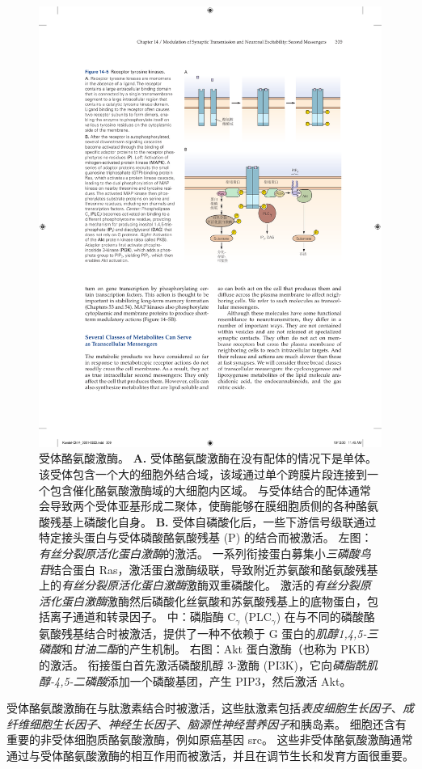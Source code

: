\begin{figure}[htbp]
	\centering
	\includegraphics[width=0.7\linewidth]{chap14/fig_14_5}
	\caption{受体酪氨酸激酶。 
		\textbf{A.} 受体酪氨酸激酶在没有配体的情况下是单体。
		该受体包含一个大的细胞外结合域，该域通过单个跨膜片段连接到一个包含催化酪氨酸激酶域的大细胞内区域。
		与受体结合的配体通常会导致两个受体亚基形成二聚体，使酶能够在膜细胞质侧的各种酪氨酸残基上磷酸化自身。
		\textbf{B.} 受体自磷酸化后，一些下游信号级联通过特定接头蛋白与受体磷酸酪氨酸残基 (P) 的结合而被激活。
		左图：\textit{有丝分裂原活化蛋白激酶}的激活。
		一系列衔接蛋白募集小\textit{三磷酸鸟苷}结合蛋白 Ras，激活蛋白激酶级联，导致附近苏氨酸和酪氨酸残基上的\textit{有丝分裂原活化蛋白激酶}激酶双重磷酸化。
		激活的\textit{有丝分裂原活化蛋白激酶}激酶然后磷酸化丝氨酸和苏氨酸残基上的底物蛋白，包括离子通道和转录因子。
		中：磷脂酶 C$_{\gamma}$ (PLC$_{\gamma}$) 在与不同的磷酸酪氨酸残基结合时被激活，提供了一种不依赖于 G 蛋白的\textit{肌醇1,4,5-三磷酸}和\textit{甘油二酯}的产生机制。
		右图：Akt 蛋白激酶（也称为 PKB）的激活。
		衔接蛋白首先激活磷酸肌醇 3-激酶 (PI3K)，它向\textit{磷脂酰肌醇-4,5-二磷酸}添加一个磷酸基团，产生 PIP3，然后激活 Akt。}
	\label{fig:14_5}
\end{figure}


受体酪氨酸激酶在与肽激素结合时被激活，这些肽激素包括\textit{表皮细胞生长因子}、\textit{成纤维细胞生长因子}、\textit{神经生长因子}、\textit{脑源性神经营养因子}和胰岛素。
细胞还含有重要的非受体细胞质酪氨酸激酶，例如原癌基因 src。
这些非受体酪氨酸激酶通常通过与受体酪氨酸激酶的相互作用而被激活，并且在调节生长和发育方面很重要。


